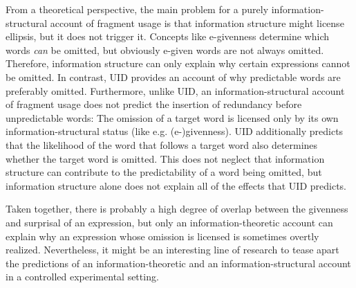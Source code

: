 From a theoretical perspective, the main problem for a purely information-structural account of fragment usage is that information structure might license ellipsis, but it does not trigger it. Concepts like e-givenness determine which words \textit{can} be omitted, but obviously e-given words are not always omitted. Therefore, information structure can only explain why certain expressions cannot be omitted. In contrast, UID provides an account of why predictable words are preferably omitted. Furthermore, unlike UID, an information-structural account of fragment usage does not predict the insertion of redundancy before unpredictable words: The omission of a target word is licensed only by its own infor\-ma\-tion-structural status (like e.g. (e-)givenness). UID additionally predicts that the likelihood of the word that follows a target word also determines whether the target word is omitted. This does not neglect that information structure can contribute to the predictability of a word being omitted, but information structure alone does not explain all of the effects that UID predicts.

Taken together, there is probably a high degree of overlap between the givenness and surprisal of an expression, but only an information-theoretic account can explain why an expression whose omission is licensed is sometimes overtly realized. Nevertheless, it might be an interesting line of research to tease apart the predictions of an information-theoretic and an information-structural account in a controlled experimental setting.
